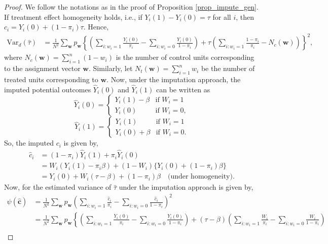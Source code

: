 \documentclass[10pt,a4paper]{amsart}
\newcommand{\Var}{{\text{Var}}}
\begin{document}
\begin{proof}
We follow the notations as in the proof of Proposition \ref{prop_impute_gen}. If treatment effect homogeneity holds, i.e., if $Y_i(1) -Y_i(0) = \tau$ for all $i$, then $c_i = Y_i(0) + (1-\pi_i)\tau$. Hence,
\begin{align}
   \Var_d(\hat{\tau}) & =   \frac{1}{N^2}\sum_{\bm{w}} p_{\bm{w}} \left\{ \left(\sum_{i:w_{i} = 1}\frac{Y_{i}(0)}{\pi_{i}} - \sum_{i:w_{i} = 0}\frac{Y_{i}(0)}{1-\pi_{i}} \right) + \tau \left(\sum_{i:w_i=1}\frac{1 - \pi_i}{\pi_i} - N_c(\bm{w}) \right) \right\}^2, \label{eq_A_impute2}
\end{align}
where $N_c(\bm{w}) = \sum_{i=1}^{n}(1-w_i)$ is the number of control units corresponding to the assignment vector $\bm{w}$. Similarly, let $N_t(\bm{w}) = \sum_{i=1}^{n}w_i$ be the number of treated units corresponding to $\bm{w}$.
Now, under the imputation approach, the imputed potential outcomes $\hat{Y}_i(0)$ and $\hat{Y}_i(1)$ can be written as
\begin{equation}
  \hat{Y}_i(0) = 
    \begin{cases}
     Y_i(1) - \beta & \text{if $W_i = 1$}\\
    Y_i(0) & \text{if $W_i = 0$},
    \end{cases}       
\end{equation}
\begin{equation}
  \hat{Y}_i(1) =
    \begin{cases}
     Y_i(1) & \text{if $W_i = 1$}\\
    Y_i(0) + \beta & \text{if $W_i = 0$}.
    \end{cases}       
\end{equation}
So, the imputed $c_i$ is given by,
\begin{align}
    \hat{c}_i & = (1-\pi_i)\hat{Y}_i(1) + \pi_i \hat{Y}_i(0) \nonumber \\
    & = W_i(Y_i(1) -\pi_i \beta) + (1-W_i)\{Y_i(0) + (1-\pi_i)\beta\} \nonumber \\
    & = Y_i(0) + W_i(\tau - \beta) + (1 - \pi_i)\beta \quad \text{(under homogeneity)}.
\end{align}
Now, for the estimated variance of $\hat{\tau}$ under the imputation approach is given by,
\begin{align}
    \psi(\hat{\bm{c}}) & = \frac{1}{N^2}\sum_{\bm{w}} p_{\bm{w}} \left(\sum_{i:w_{i} = 1}\frac{\hat{c}_{i}}{\pi_{i}} - \sum_{i:w_{i} = 0}\frac{\hat{c}_{i}}{1-\pi_{i}} \right)^2 \nonumber \\
    & = \frac{1}{N^2} \sum_{\bm{w}}p_{\bm{w}} \left\{ \left(\sum_{i:w_i = 1}\frac{Y_i(0)}{\pi_i} - \sum_{i:w_i = 0}\frac{Y_i(0)}{1-\pi_i} \right) + (\tau - \beta) \left(\sum_{i:w_i = 1}\frac{W_i}{\pi_i} - \sum_{i:w_i = 0}\frac{W_i}{1-\pi_i} \right) \right. \nonumber \\

\end{align}
\end{proof}
\end{document}
